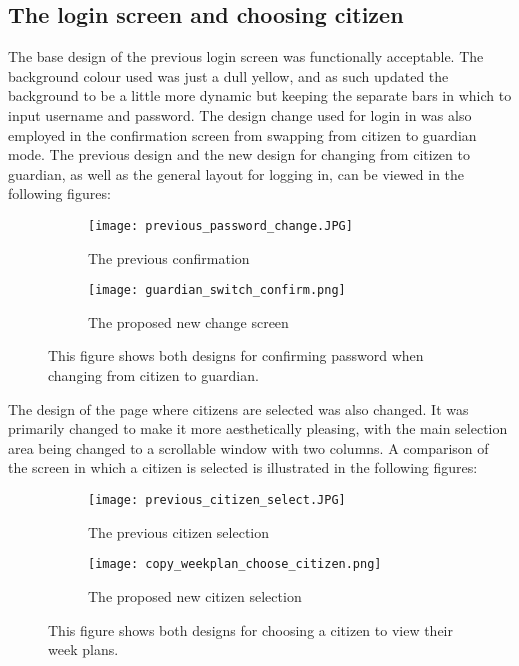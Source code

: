 \subsection{The login screen and choosing citizen}
The base design of the previous login screen was functionally acceptable. 
The background colour used was just a dull yellow, and as such updated the background to be a little more dynamic but keeping the separate bars in which to input username and password.
The design change used for login in was also employed in the confirmation screen from swapping from citizen to guardian mode. 
The previous design and the new design for changing from citizen to guardian, as well as the general layout for logging in, can be viewed in the following figures:
\begin{figure}[H]
    \begin{subfigure}{0.5\textwidth}
    \texttt{[image: previous\_password\_change.JPG]} 
    \caption{The previous confirmation}
    \label{fig:previous_guardian_confirm}
    \end{subfigure}
    \begin{subfigure}{0.5\textwidth}
        \texttt{[image: guardian\_switch\_confirm.png]}
    \caption{The proposed new change screen}
    \label{fig:new_guardian_confirm}
    \end{subfigure} 
    \caption{This figure shows both designs for confirming password when changing from citizen to guardian.}
    \label{fig:guardian_confirm}
\end{figure}
\noindent
The design of the page where citizens are selected was also changed.
It was  primarily changed to make it more aesthetically pleasing, with the main selection area being changed to a scrollable window with two columns. 
A comparison of the screen in which a citizen is selected is illustrated in the following figures:
\begin{figure}[H]
    \begin{subfigure}{0.5\textwidth}
    \texttt{[image: previous\_citizen\_select.JPG]} 
    \caption{The previous citizen selection}
    \label{fig:previous_guardian_confirm}
    \end{subfigure}
    \begin{subfigure}{0.5\textwidth}
        \texttt{[image: copy\_weekplan\_choose\_citizen.png]}
    \caption{The proposed new citizen selection}
    \label{fig:new_guardian_confirm}
    \end{subfigure} 
    \caption{This figure shows both designs for choosing a citizen to view their week plans.}
    \label{fig:guardian_confirm}
\end{figure}
\noindent


